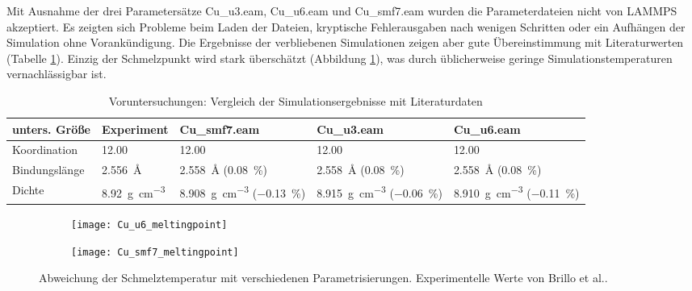 Mit Ausnahme der drei Parametersätze Cu\_u3.eam, Cu\_u6.eam und Cu\_smf7.eam wurden die Parameterdateien nicht von LAMMPS akzeptiert.
Es zeigten sich Probleme beim Laden der Dateien, kryptische Fehlerausgaben nach wenigen Schritten oder ein Aufhängen der Simulation ohne Vorankündigung.
Die Ergebnisse der verbliebenen Simulationen zeigen aber gute Übereinstimmung mit Literaturwerten (Tabelle \ref{tab:copperpreresults}).
Einzig der Schmelzpunkt wird stark überschätzt (Abbildung \ref{fig:copperthermo}), was durch üblicherweise geringe Simulationstemperaturen vernachlässigbar ist.

\begin{table}[bht]
  \caption[Eigenschaften von Kupfer]{Voruntersuchungen: Vergleich der Simulationsergebnisse mit Literaturdaten}
  \label{tab:copperpreresults}
  \begin{tabularx}{\textwidth}{|lXXXX|}
    \hline
    \textbf{unters. Größe} & \textbf{Experiment} & \textbf{Cu\_smf7.eam} & \textbf{Cu\_u3.eam} & \textbf{Cu\_u6.eam} \\
    \hline
    Koordination   &  \SI{12.00}{} & \SI{12.00}{} & \SI{12.00}{} & \SI{12.00}{} \\
    Bindungslänge  &  \SI{2.556}{\angstrom} & \SI{2.558}{\angstrom} (\SI{0.08}{\percent}) & \SI{2.558}{\angstrom} (\SI{0.08}{\percent}) & \SI{2.558}{\angstrom} (\SI{0.08}{\percent}) \\
    Dichte         & \SI{8.92}{\gram\per\cubic\centi\meter} & \SI{8.908}{\gram\per\cubic\centi\meter} (\SI{-0.13}{\percent}) & \SI{8.915}{\gram\per\cubic\centi\meter} (\SI{-0.06}{\percent}) & \SI{8.910}{\gram\per\cubic\centi\meter}  (\SI{-0.11}{\percent}) \\
    \hline
  \end{tabularx}
\end{table}

\begin{figure}[hp]
  \captionsetup[subfigure]{singlelinecheck=false}
  \def\subfigwidth{7cm}
  \begin{subfigure}[t]{\subfigwidth}
    \texttt{[image: Cu\_u6\_meltingpoint]}
  \end{subfigure}
  \hfill
  \begin{subfigure}[t]{\subfigwidth}
    \texttt{[image: Cu\_smf7\_meltingpoint]}
  \end{subfigure}
  \caption[Abweichung der Schmelztemperaturen bei Kupfer-MD]{
    Abweichung der Schmelztemperatur mit verschiedenen Parametrisierungen.
    Experimentelle Werte von Brillo et al.\cite{brillo_density_2006}.
  }
  \label{fig:copperthermo}
\end{figure}


